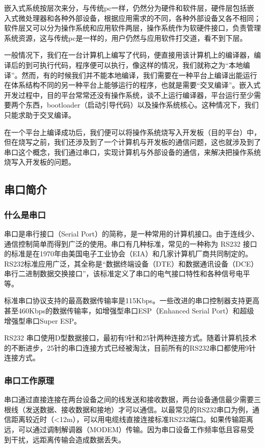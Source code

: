 嵌入式系统按层次来分，与传统pc一样，仍然分为硬件和软件层，硬件层包括嵌入式微处理器和各种外部设备，根据应用需求的不同，各种外部设备又各不相同；软件层又可以分为操作系统和应用软件两层，操作系统作为软硬件接口，负责管理系统资源，这与传统pc是一样的，用户仍然与应用软件打交道，看不到下层。

一般情况下，我们在一台计算机上编写了代码，便直接用该计算机上的编译器，编译后的到可执行代码，程序便可以执行，像这样的情况，我们就称之为“本地编译”。然而，有的时候我们并不能本地编译，我们需要在一种平台上编译出能运行在体系结构不同的另一种平台上能够运行的程序，也就是需要“交叉编译”。嵌入式开发过程中，目的平台常常还没有操作系统，谈不上运行编译器，平台运行至少需要两个东西，bootloader（启动引导代码）以及操作系统核心。这种情况下，我们只能求助于交叉编译。

在一个平台上编译成功后，我们便可以将操作系统烧写入开发板（目的平台）中，但在烧写之前，我们还涉及到了一个计算机与开发板的通信问题，这也就涉及到了串口这个概念，我们通过串口，实现计算机与外部设备的通信，来解决把操作系统烧写入开发板的问题。

\subsection{串口简介}

\subsubsection{什么是串口}

串口是串行接口（Serial Port）的简称，是一种常用的计算机接口。由于连线少、通信控制简单而得到广泛的使用。串口有几种标准，常见的一种称为 RS232 接口的标准是在1970年由美国电子工业协会（EIA）和几家计算机厂商共同制定的。RS232标准应用广泛，其全称是“数据终端设备（DTE）和数据通讯设备（DCE）串行二进制数据交换接口”，该标准定义了串口的电气接口特性和各种信号电平等。


标准串口协议支持的最高数据传输率是115Kbps。一些改进的串口控制器支持更高甚至460Kbps的数据传输率，如增强型串口ESP（Enhanced Serial Port）和超级增强型串口Super ESP。


RS232 串口使用D型数据接口，最初有9针和25针两种连接方式。随着计算机技术的不断进步，25针的串口连接方式已经被淘汰，目前所有的RS232串口都使用9针连接方式。

\subsubsection{串口工作原理}

串口通过直接连接在两台设备之间的线发送和接收数据，两台设备通信最少需要三根线（发送数据、接收数据和接地）才可以通信。以最常见的RS232串口为例，通信距离较近时（<12m），可以用电缆线直接连接标准RS232端口。如果传输距离远，可以通过调制解调器（MODEM）传输。因为串口设备工作频率低且容易受到干扰，远距离传输会造成数据丢失。

